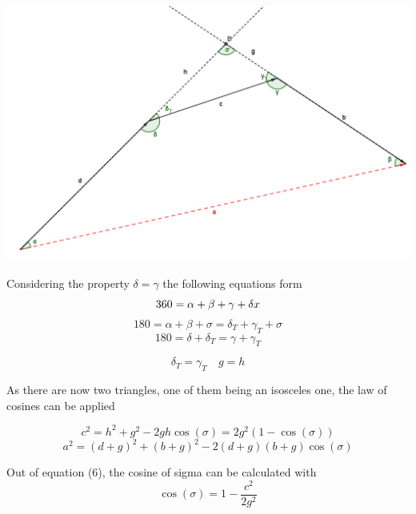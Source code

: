 \documentclass{article}
\begin{document}
    \includegraphics[scale=0.5]{images/polySchematic.PNG}
    
    Considering the property $\delta = \gamma$ the following equations form
        \begin{equation} 360 = \alpha + \beta + \gamma + \delta \newline x\end{equation}
        \begin{equation} 180 = \alpha + \beta + \sigma = \delta_T + \gamma_T + \sigma \end{equation}
        \begin{equation} 180 = \delta + \delta_T = \gamma + \gamma_T \end{equation}
        
        \begin{equation} \delta_T = \gamma_T \quad g = h \end{equation}
    
    As there are now two triangles, one of them being an isosceles one, the law of cosines can be applied
    
        \begin{equation} 
        c^2 = h^2 + g^2 - 2gh\cos(\sigma) = 2g^2 ( 1 - \cos(\sigma) )
        \end{equation}
        \begin{equation} 
        a^2 = (d + g)^2 + (b + g)^2 - 2(d + g)(b + g)\cos(\sigma)
        \end{equation}
    
    Out of equation (6), the cosine of sigma can be calculated with
        \begin{equation} 
        \cos(\sigma) = 1 - \frac{c^2}{2g^2}
        \end{equation}
    
\end{document}
